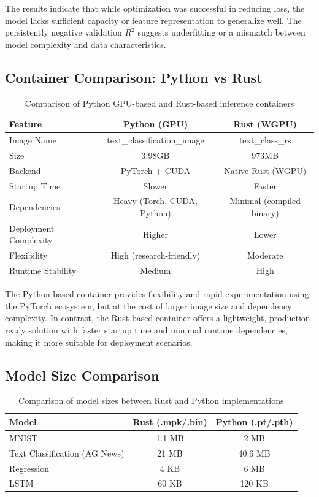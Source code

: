 \documentclass{ieeeaccess}
\begin{document}
The results indicate that while optimization was successful in reducing loss, the model lacks sufficient capacity or feature representation to generalize well. The persistently negative validation $R^2$ suggests underfitting or a mismatch between model complexity and data characteristics.




\newpage

\subsection{Container Comparison: Python vs Rust}

\begin{table}[t!]
\centering
\begin{tabular}{|l|c|c|}
\hline
\textbf{Feature} & \textbf{Python (GPU)} & \textbf{Rust (WGPU)} \\
\hline
Image Name & text\_classification\_image & text\_class\_rs \\
\hline
Size &  3.98GB &  973MB \\
\hline
Backend & PyTorch + CUDA & Native Rust (WGPU) \\
\hline
Startup Time & Slower & Faster \\
\hline
Dependencies & Heavy (Torch, CUDA, Python) & Minimal (compiled binary) \\
\hline
Deployment Complexity & Higher & Lower \\
\hline
Flexibility & High (research-friendly) & Moderate \\
\hline
Runtime Stability & Medium & High \\
\hline
\end{tabular}
\caption{Comparison of Python GPU-based and Rust-based inference containers}
\end{table}

\noindent
The Python-based container provides flexibility and rapid experimentation using the PyTorch ecosystem, but at the cost of larger image size and dependency complexity. In contrast, the Rust-based container offers a lightweight, production-ready solution with faster startup time and minimal runtime dependencies, making it more suitable for deployment scenarios.


\subsection{Model Size Comparison}

\begin{table}[t!]
\centering
\begin{tabular}{|l|c|c|}
\hline
\textbf{Model} & \textbf{Rust (.mpk/.bin)} & \textbf{Python (.pt/.pth)} \\
\hline
MNIST & 1.1 MB & 2 MB \\
\hline
Text Classification (AG News) & 21 MB & 40.6 MB \\
\hline
Regression & 4 KB & 6 MB \\
\hline
LSTM & 60 KB & 120 KB \\
\hline
\end{tabular}
\caption{Comparison of model sizes between Rust and Python implementations}
\end{table}
\end{document}
